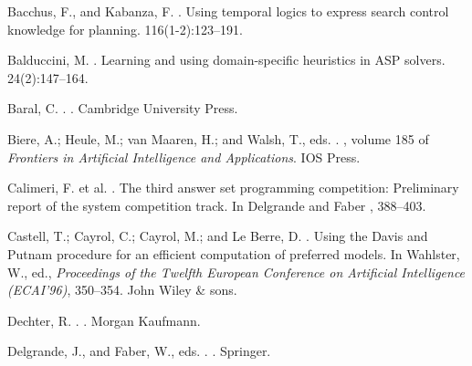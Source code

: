 \documentclass[letterpaper]{article}
\begin{document}

\begin{thebibliography}{}

Bacchus, F., and Kabanza, F.
.
\newblock Using temporal logics to express search control knowledge for
  planning.
 116(1-2):123--191.

Balduccini, M.
.
\newblock Learning and using domain-specific heuristics in {ASP} solvers.
 24(2):147--164.

Baral, C.
.
.
\newblock Cambridge University Press.

Biere, A.; Heule, M.; {van Maaren}, H.; and Walsh, T., eds.
.
, volume 185 of {\em Frontiers in
  Artificial Intelligence and Applications}.
\newblock IOS Press.

Calimeri, F. et al.
.
\newblock The third answer set programming competition: Preliminary report of
  the system competition track.
\newblock In Delgrande and Faber ,  388--403.

Castell, T.; Cayrol, C.; Cayrol, M.; and {Le Berre}, D.
.
\newblock Using the {D}avis and {P}utnam procedure for an efficient computation
  of preferred models.
\newblock In Wahlster, W., ed., {\em Proceedings of the Twelfth European
  Conference on Artificial Intelligence (ECAI'96)},  350--354.
\newblock John Wiley \& sons.

Dechter, R.
.
.
\newblock Morgan Kaufmann.

Delgrande, J., and Faber, W., eds.
.
. Springer.


\end{thebibliography}
\end{document}
